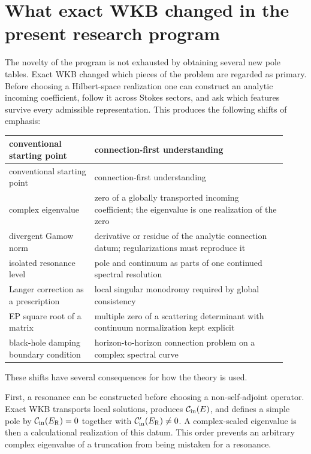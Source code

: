 \section{What exact WKB changed in the present research program}
\label{sec:program-development}

The novelty of the program is not exhausted by obtaining several new pole
tables.  Exact WKB changed which pieces of the problem are regarded as
primary.  Before choosing a Hilbert-space realization one can construct an
analytic incoming coefficient, follow it across Stokes sectors, and ask which
features survive every admissible representation.  This produces the
following shifts of emphasis:
\begin{longtable}{@{}p{0.29\linewidth}p{0.63\linewidth}@{}}
\toprule
conventional starting point & connection-first understanding \\
\midrule
\endfirsthead
\toprule
conventional starting point & connection-first understanding \\
\midrule
\endhead
complex eigenvalue & zero of a globally transported incoming coefficient;
the eigenvalue is one realization of the zero \\
\addlinespace
divergent Gamow norm & derivative or residue of the analytic connection datum;
regularizations must reproduce it \\
\addlinespace
isolated resonance level & pole and continuum as parts of one continued
spectral resolution \\
\addlinespace
Langer correction as a prescription & local singular monodromy required by
global consistency \\
\addlinespace
EP square root of a matrix & multiple zero of a scattering determinant with
continuum normalization kept explicit \\
\addlinespace
black-hole damping boundary condition & horizon-to-horizon connection problem
on a complex spectral curve \\
\bottomrule
\end{longtable}

These shifts have several consequences for how the theory is used.

First, a resonance can be constructed before choosing a non-self-adjoint
operator.  Exact WKB transports local solutions, produces
$\mathcal{C}_{\mathrm{in}}(E)$, and defines a simple pole by
$\mathcal{C}_{\mathrm{in}}(E_{\mathrm{R}})=0$ together with
$\mathcal{C}_{\mathrm{in}}'(E_{\mathrm{R}})\neq0$.  A complex-scaled eigenvalue is then
a calculational realization of this datum.  This order prevents an arbitrary
complex eigenvalue of a truncation from being mistaken for a resonance.

